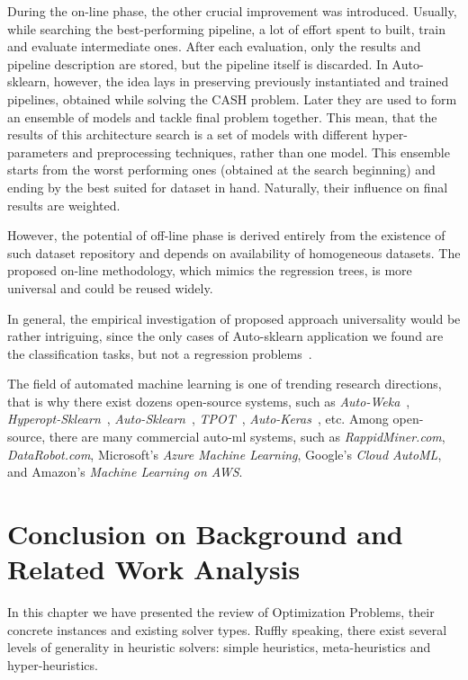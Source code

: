 During the on-line phase, the other crucial improvement was introduced. 
Usually, while searching the best-performing pipeline, a lot of effort spent to built, train and evaluate intermediate ones. After each evaluation, only the results and pipeline description are stored, but the pipeline itself is discarded. In Auto-sklearn, however, the idea lays in preserving previously instantiated and trained pipelines, obtained while solving the CASH problem. Later they are used to form an ensemble of models and tackle final problem together. This mean, that the results of this architecture search is a set of models with different hyper-parameters and preprocessing techniques, rather than one model. This ensemble starts from the worst performing ones (obtained at the search beginning) and ending by the best suited for dataset in hand. Naturally, their influence on final results are weighted.

However, the potential of off-line phase is derived entirely from the existence of such dataset repository and depends on availability of homogeneous datasets. The proposed on-line methodology, which mimics the regression trees, is more universal and could be reused widely.

In general, the empirical investigation of proposed approach universality would be rather intriguing, since the only cases of Auto-sklearn application we found are the classification tasks, but not a regression problems~\cite{feurer2015efficient,biedenkapp-ecai20}.


The field of automated machine learning is one of trending research directions, that is why there exist dozens open-source systems, such as \textit{Auto-Weka}~\cite{thornton2013auto}, \textit{Hyperopt-Sklearn}~\cite{komer2014hyperopt}, \textit{Auto-Sklearn}~\cite{feurer2015efficient}, \textit{TPOT}~\cite{olson2019tpot}, \textit{Auto-Keras}~\cite{jin2019auto}, etc. Among open-source, there are many commercial auto-ml systems, such as \textit{RappidMiner.com}, \textit{DataRobot.com}, Microsoft’s \textit{Azure Machine Learning}, Google’s \textit{Cloud AutoML}, and Amazon's \textit{Machine Learning on AWS}.


\section{Conclusion on Background and Related Work Analysis}\label{bg: section conclusion}
In this chapter we have presented the review of Optimization Problems, their concrete instances and existing solver types.
Ruffly speaking, there exist several levels of generality in heuristic solvers: simple heuristics, meta-heuristics and hyper-heuristics.

